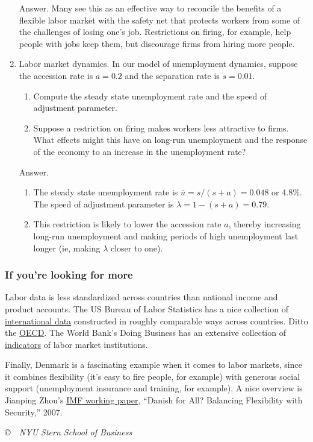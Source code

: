 \documentclass[letterpaper,12pt]{article}
\begin{document}
\begin{enumerate}
Answer.  Many see this as an effective way to
reconcile the benefits of a flexible labor market
with the safety net that protects workers from some
of the challenges of losing one's job.
Restrictions on firing, for example, help people with jobs keep them,
but discourage firms from hiring more people.


\item Labor market dynamics.
In our model of unemployment dynamics, suppose the accession rate is
$a = 0.2$ and the separation rate is $s = 0.01$.
\begin{enumerate}
\item Compute the steady state unemployment rate and the speed
of adjustment parameter.
\item Suppose a restriction on firing makes workers less attractive to firms.
What effects might this have on long-run unemployment
and the response of the economy to an increase in the unemployment rate?
\end{enumerate}

Answer.
\begin{enumerate}
\item The steady state unemployment rate is $\bar{u} = s/(s+a) = 0.048$
or 4.8\%.
The speed of adjustment parameter is $\lambda = 1-(s+a) = 0.79$.
\item This restriction is likely to lower the accession rate $a$,
thereby increasing long-run unemployment and making periods of high unemployment
last longer (ie, making $\lambda$ closer to one).
\end{enumerate}



\end{enumerate}

\subsubsection*{If you're looking for more}


Labor data is less standardized across countries than national
income and product accounts.
The US Bureau of Labor Statistics has a nice collection
of
\href{http://www.bls.gov/fls/}{international data}
constructed in roughly comparable ways across countries.
Ditto the
\href{http://www.oecd.org/topicstatsportal/0,2647,en_2825_495670_1_1_1_1_1,00.html}
{OECD}.
The World Bank's Doing Business
has an extensive collection of
\href{http://www.doingbusiness.org/data/exploretopics/employing-workers}
{indicators}
of labor market institutions.

Finally, Denmark is a fascinating example when it comes to labor markets, 
since it combines flexibility (it's easy to fire people, for example)
with generous social support (unemployment insurance
and training, for example).
A nice overview is
Jianping Zhou's
\href{http://www.imf.org/external/pubs/ft/wp/2007/wp0736.pdf}
{IMF working paper},
``Danish for All? Balancing Flexibility with Security,'' 2007.


\vfill \centerline{\it \copyright \ \number\year \ NYU Stern
School of Business}
\end{document}
